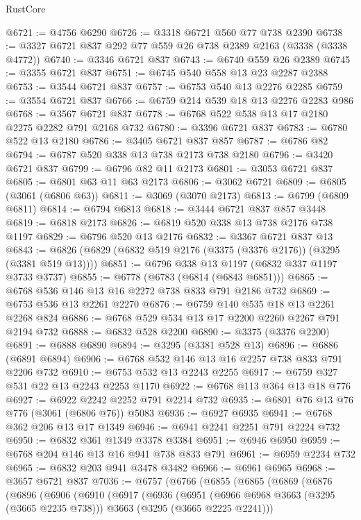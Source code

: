 \begin{lexlean}{RustCore}
\begin{coremodule}
@6721 := @4756 @6290
@6726 := @3318 @6721 @560 @77 @738 @2390
@6738 := @3327 @6721 @837 @292 @77 @559 @26 @738 @2389 @2163 (@3338 (@3338 @4772))
@6740 := @3346 @6721 @837
@6743 := @6740 @559 @26 @2389
@6745 := @3355 @6721 @837
@6751 := @6745 @540 @558 @13 @23 @2287 @2388
@6753 := @3544 @6721 @837
@6757 := @6753 @540 @13 @2276 @2285
@6759 := @3554 @6721 @837
@6766 := @6759 @214 @539 @18 @13 @2276 @2283 @986
@6768 := @3567 @6721 @837
@6778 := @6768 @522 @538 @13 @17 @2180 @2275 @2282 @791 @2168 @732
@6780 := @3396 @6721 @837
@6783 := @6780 @522 @13 @2180
@6786 := @3405 @6721 @837 @857
@6787 := @6786 @82
@6794 := @6787 @520 @338 @13 @738 @2173 @738 @2180
@6796 := @3420 @6721 @837
@6799 := @6796 @82 @11 @2173
@6801 := @3053 @6721 @837
@6805 := @6801 @63 @11 @63 @2173
@6806 := @3062 @6721
@6809 := @6805 (@3061 (@6806 @63))
@6811 := @3069 (@3070 @2173)
@6813 := @6799 (@6809 @6811)
@6814 := @6794 @6813
@6818 := @3444 @6721 @837 @857 @3448
@6819 := @6818 @2173
@6826 := @6819 @520 @338 @13 @738 @2176 @738 @1197
@6829 := @6796 @520 @13 @2176
@6832 := @3367 @6721 @837 @13
@6843 := @6826 (@6829 (@6832 @519 @2176 (@3375 (@3376 @2176)) (@3295 (@3381 @519 @13))))
@6851 := @6796 @338 @13 @1197 (@6832 @337 @1197 @3733 @3737)
@6855 := @6778 (@6783 (@6814 (@6843 @6851)))
@6865 := @6768 @536 @146 @13 @16 @2272 @738 @833 @791 @2186 @732
@6869 := @6753 @536 @13 @2261 @2270
@6876 := @6759 @140 @535 @18 @13 @2261 @2268 @824
@6886 := @6768 @529 @534 @13 @17 @2200 @2260 @2267 @791 @2194 @732
@6888 := @6832 @528 @2200
@6890 := @3375 (@3376 @2200)
@6891 := @6888 @6890
@6894 := @3295 (@3381 @528 @13)
@6896 := @6886 (@6891 @6894)
@6906 := @6768 @532 @146 @13 @16 @2257 @738 @833 @791 @2206 @732
@6910 := @6753 @532 @13 @2243 @2255
@6917 := @6759 @327 @531 @22 @13 @2243 @2253 @1170
@6922 := @6768 @113 @364 @13 @18 @776
@6927 := @6922 @2242 @2252 @791 @2214 @732
@6935 := @6801 @76 @13 @76 @776 (@3061 (@6806 @76)) @5083
@6936 := @6927 @6935
@6941 := @6768 @362 @206 @13 @17 @1349
@6946 := @6941 @2241 @2251 @791 @2224 @732
@6950 := @6832 @361 @1349 @3378 @3384
@6951 := @6946 @6950
@6959 := @6768 @204 @146 @13 @16 @941 @738 @833 @791
@6961 := @6959 @2234 @732
@6965 := @6832 @203 @941 @3478 @3482
@6966 := @6961 @6965
@6968 := @3657 @6721 @837
@7036 := @6757
    (@6766
      (@6855
        (@6865
          (@6869
            (@6876
              (@6896
                (@6906
                  (@6910
                    (@6917
                      (@6936
                        (@6951
                          (@6966 @6968 @3663 (@3295 (@3665 @2235 @738)))
                          @3663
                          (@3295 (@3665 @2225 @2241)))

\end{coremodule}
\end{lexlean}
